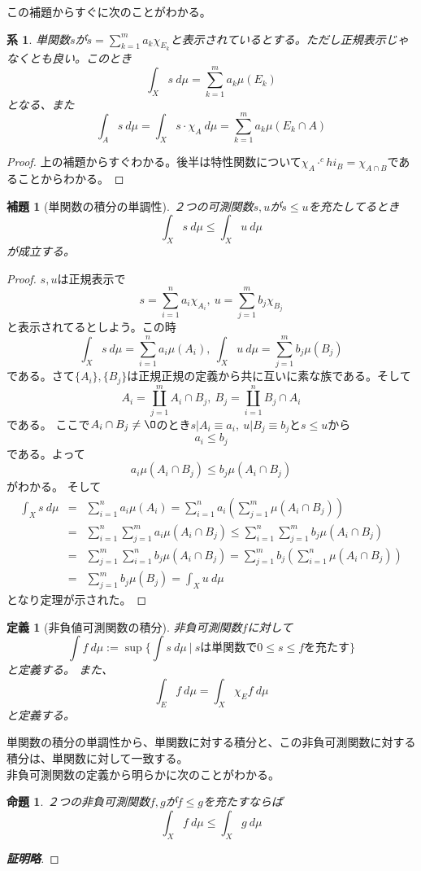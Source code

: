 \documentclass[leqno]{jsarticle}
\newtheorem{prop}[thm]{命題}
\newtheorem{cor}[thm]{系}
\newtheorem{lem}[thm]{補題}
\newtheorem{df}[thm]{定義}
\newcommand{\dpst}{\displaystyle}
\begin{document}
この補題からすぐに次のことがわかる。
\begin{cor}
単関数$s$が$\dpst s=\sum_{k=1}^ma_k\chi_{E_k}$と表示されているとする。ただし正規表示じゃなくとも良い。このとき
\[
\int_{X}s\ d\mu=\sum_{k=1}^{m}a_k\mu(E_k)
\]
となる、また
\[
\int_{A}s\ d\mu=\int_{X}s\cdot \chi_{A}\ d\mu=\sum_{k=1}^{m}a_k\mu(E_k\cap A)
\]
\end{cor}
\begin{proof}上の補題からすぐわかる。後半は特性関数について$\chi_A \cdot ^chi_B=\chi_{A\cap B}$であることからわかる。
\end{proof}
\begin{lem}[単関数の積分の単調性]
２つの可測関数$s,u$が$s\le u$を充たしてるとき
\[
\int_X s\ d\mu\le \int_X u\ d\mu
\]
が成立する。
\end{lem}
\begin{proof}$s,u$は正規表示で
\[
s=\sum_{i=1}^na_i\chi_{A_i},\ u=\sum_{j=1}^mb_j\chi_{B_j}
\]
と表示されてるとしよう。この時
\[
\int_X s\ d\mu=\sum_{i=1}^na_i\mu(A_i),\ \int_Xu\ d\mu=\sum_{j=1}^mb_j\mu(B_j)
\]
である。さて$\{A_i\},\{B_j\}$は正規正規の定義から共に互いに素な族である。そして
\[
A_i=\coprod_{j=1}^m A_i\cap B_j,\ B_j=\coprod_{i=1}^n B_j\cap A_i
\]である。
ここで$A_i\cap B_j\neq \O$のとき$s|A_i\equiv a_i,\ u|B_j\equiv b_j$と$s\le u$から
\[
a_i\le b_j
\]
である。よって
\[
a_i\mu(A_i\cap B_j)\le b_j\mu(A_i\cap B_j)
\]がわかる。
そして
\begin{eqnarray*}
\int_X s\ d\mu&=&\sum_{i=1}^na_i\mu(A_i)=
\sum_{i=1}^na_i\left(\sum_{j=1}^m\mu(A_i\cap B_j)\right)\\ 
&=&\sum_{i=1}^n\sum_{j=1}^ma_i\mu(A_i\cap B_j)
\le \sum_{i=1}^n\sum_{j=1}^mb_j\mu(A_i\cap B_j)\\ 
&=&\sum_{j=1}^m\sum_{i=1}^nb_j\mu(A_i\cap B_j)
=\sum_{j=1}^mb_j\left(\sum_{i=1}^n\mu(A_i\cap B_j)\right)\\ 
&=&\sum_{j=1}^mb_j\mu(B_j)=\int_Xu\ d\mu
\end{eqnarray*}
となり定理が示された。
\end{proof}



\begin{df}[非負値可測関数の積分]非負可測関数$f$に対して
\[
\int f \ d\mu := \sup \{\int s\ d\mu \ |\ sは単関数で0\le s\le fを充たす \}
\]と定義する。
また、
\[
\int_Ef\ d\mu=\int_X\chi_{E}f\ d\mu 
\]
と定義する。
\end{df}

単関数の積分の単調性から、単関数に対する積分と、この非負可測関数に対する積分は、単関数に対して一致する。\\ 
非負可測関数の定義から明らかに次のことがわかる。
\begin{prop}
２つの非負可測関数$f,g$が$f\le g$を充たすならば
\[
\int_X f\ d\mu \le \int_{X}g\ d\mu
\]
\end{prop}
\begin{proof}[{\bf 証明略}]
\end{proof}
\end{document}
